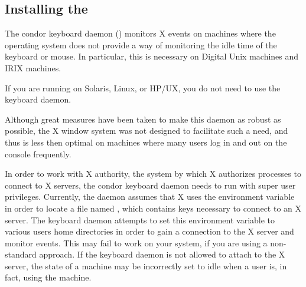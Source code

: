 \subsection{\label{sec:kbdd}Installing the }

The condor keyboard daemon () monitors X events on
machines where the operating system does not provide a way of
monitoring the idle time of the keyboard or mouse.  In particular,
this is necessary on Digital Unix machines and IRIX machines.  

\Note If you are running on Solaris, Linux, or HP/UX, you do
not need to use the keyboard daemon.

Although great measures have been taken to make this daemon as robust
as possible, the X window system was not designed to facilitate such a
need, and thus is less then optimal on machines where many users log
in and out on the console frequently.

In order to work with X authority, the system by which X authorizes
processes to connect to X servers, the condor keyboard daemon needs to
run with super user privileges.  Currently, the daemon assumes that X
uses the  environment variable in order to locate a file
named , which contains keys necessary to connect to
an X server.  The keyboard daemon attempts to set this environment
variable to various users home directories in order to gain a
connection to the X server and monitor events.  This may fail to work
on your system, if you are using a non-standard approach.  If the
keyboard daemon is not allowed to attach to the X server, the state of
a machine may be incorrectly set to idle when a user is, in fact,
using the machine.

